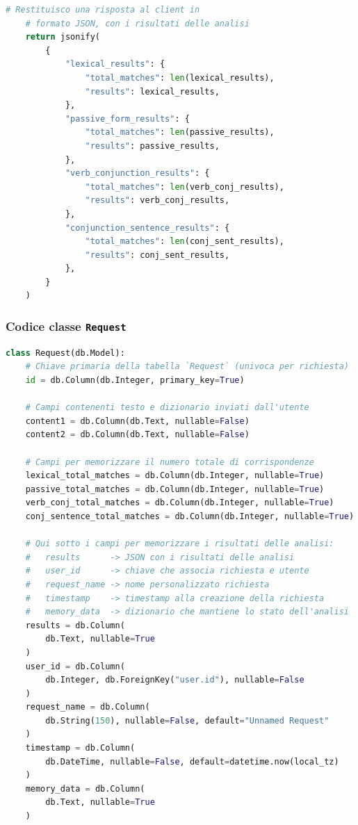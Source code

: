 \documentclass[12pt]{report}
\begin{document}
\begin{lstlisting}[language=Python]
    # Restituisco una risposta al client in
    # formato JSON, con i risultati delle analisi
    return jsonify(
        {
            "lexical_results": {
                "total_matches": len(lexical_results),
                "results": lexical_results,
            },
            "passive_form_results": {
                "total_matches": len(passive_results),
                "results": passive_results,
            },
            "verb_conjunction_results": {
                "total_matches": len(verb_conj_results),
                "results": verb_conj_results,
            },
            "conjunction_sentence_results": {
                "total_matches": len(conj_sent_results),
                "results": conj_sent_results,
            },
        }
    )
\end{lstlisting}


\subsubsection{Codice classe \texttt{Request}}
\begin{lstlisting}[language=Python]
class Request(db.Model):
    # Chiave primaria della tabella `Request` (univoca per richiesta)
    id = db.Column(db.Integer, primary_key=True)

    # Campi contenenti testo e dizionario inviati dall'utente
    content1 = db.Column(db.Text, nullable=False)
    content2 = db.Column(db.Text, nullable=False)

    # Campi per memorizzare il numero totale di corrispondenze
    lexical_total_matches = db.Column(db.Integer, nullable=True)
    passive_total_matches = db.Column(db.Integer, nullable=True)
    verb_conj_total_matches = db.Column(db.Integer, nullable=True)
    conj_sentence_total_matches = db.Column(db.Integer, nullable=True)

    # Qui sotto i campi per memorizzare i risultati delle analisi:
    #   results      -> JSON con i risultati delle analisi
    #   user_id      -> chiave che associa richiesta e utente
    #   request_name -> nome personalizzato richiesta
    #   timestamp    -> timestamp alla creazione della richiesta
    #   memory_data  -> dizionario che mantiene lo stato dell'analisi
    results = db.Column(
        db.Text, nullable=True
    )
    user_id = db.Column(
        db.Integer, db.ForeignKey("user.id"), nullable=False
    )
    request_name = db.Column(
        db.String(150), nullable=False, default="Unnamed Request"
    )
    timestamp = db.Column(
        db.DateTime, nullable=False, default=datetime.now(local_tz)
    )
    memory_data = db.Column(
        db.Text, nullable=True
    )
\end{lstlisting}
\end{document}
